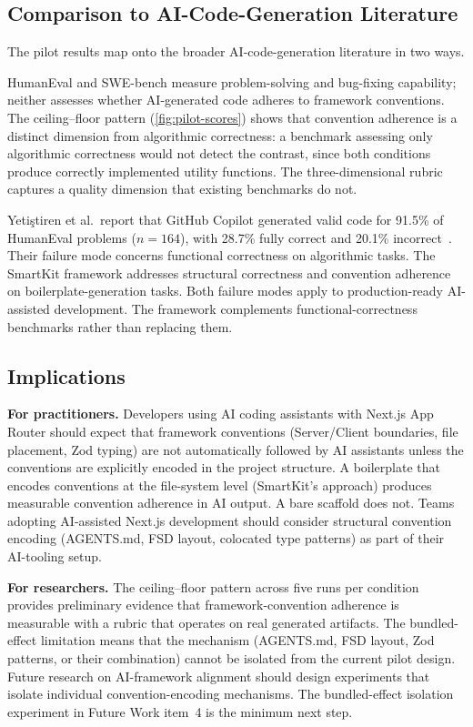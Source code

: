 \documentclass[12pt,a4paper]{report}
\begin{document}
\subsection{Comparison to AI-Code-Generation Literature}
\label{sec:literature-comparison}

The pilot results map onto the broader AI-code-generation literature in two ways.

HumanEval and SWE-bench measure problem-solving and bug-fixing capability; neither assesses whether AI-generated code adheres to framework conventions. The ceiling--floor pattern (\autoref{fig:pilot-scores}) shows that convention adherence is a distinct dimension from algorithmic correctness: a benchmark assessing only algorithmic correctness would not detect the contrast, since both conditions produce correctly implemented utility functions. The three-dimensional rubric captures a quality dimension that existing benchmarks do not.

Yeti\c{s}tiren et al.\ report that GitHub Copilot generated valid code for 91.5\% of HumanEval problems ($n=164$), with 28.7\% fully correct and 20.1\% incorrect~\parencite{yetistiren2022assessing}. Their failure mode concerns functional correctness on algorithmic tasks. The SmartKit framework addresses structural correctness and convention adherence on boilerplate-generation tasks. Both failure modes apply to production-ready AI-assisted development. The framework complements functional-correctness benchmarks rather than replacing them.

\subsection{Implications}
\label{sec:implications}

\textbf{For practitioners.} Developers using AI coding assistants with Next.js App Router should expect that framework conventions (Server/Client boundaries, file placement, Zod typing) are not automatically followed by AI assistants unless the conventions are explicitly encoded in the project structure. A boilerplate that encodes conventions at the file-system level (SmartKit's approach) produces measurable convention adherence in AI output. A bare scaffold does not. Teams adopting AI-assisted Next.js development should consider structural convention encoding (AGENTS.md, FSD layout, colocated type patterns) as part of their AI-tooling setup.

\textbf{For researchers.} The ceiling--floor pattern across five runs per condition provides preliminary evidence that framework-convention adherence is measurable with a rubric that operates on real generated artifacts. The bundled-effect limitation means that the mechanism (AGENTS.md, FSD layout, Zod patterns, or their combination) cannot be isolated from the current pilot design. Future research on AI-framework alignment should design experiments that isolate individual convention-encoding mechanisms. The bundled-effect isolation experiment in Future Work item~4 is the minimum next step.
\end{document}
